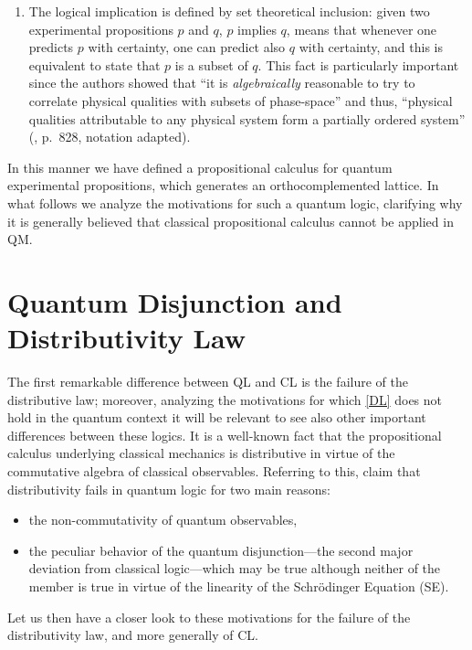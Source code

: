 \documentclass[11pt, executivepaper]{article}
\begin{document}
\begin{enumerate}
\item The logical implication is defined by set theoretical inclusion: given two experimental propositions $p$ and $q$, 
$p$ implies $q$, means that whenever one predicts $p$ with certainty, one can predict also $q$ with certainty, and this is equivalent to state that $p$ is a subset of $q$. This fact is particularly important since the authors showed that ``it is \emph{algebraically} reasonable to try to correlate physical qualities with subsets of phase-space'' and thus, ``physical qualities attributable to any physical system form a partially ordered system'' (\cite{vonNeumann:1936}, p.\ 828, notation adapted).
\end{enumerate}

In this manner we have defined a propositional calculus for quantum experimental propositions, which generates an orthocomplemented lattice. In what follows we analyze the motivations for such a quantum logic, clarifying why it is generally believed that classical propositional calculus cannot be applied in QM. 

\section{Quantum Disjunction and Distributivity Law}
\label{Motivations}

The first remarkable difference between QL and CL is the failure of the distributive law; moreover, analyzing the motivations for which \eqref{DL} does not hold in the quantum context it will be relevant to see also other important differences between these logics. It is a well-known fact that the propositional calculus underlying classical mechanics is distributive in virtue of the commutative algebra of classical observables. Referring to this, \cite{Giuntini:2002} claim that distributivity fails in quantum logic for two main reasons:
\begin{itemize}
\item the non-commutativity of quantum observables,
\item the peculiar behavior of the quantum disjunction---the second major deviation from classical logic---which may be true although neither of the member is true in virtue of the linearity of the Schr\"odinger Equation (SE). 
\end{itemize}
\noindent Let us then have a closer look to these motivations for the failure of the distributivity law, and more generally of CL.
\end{document}
